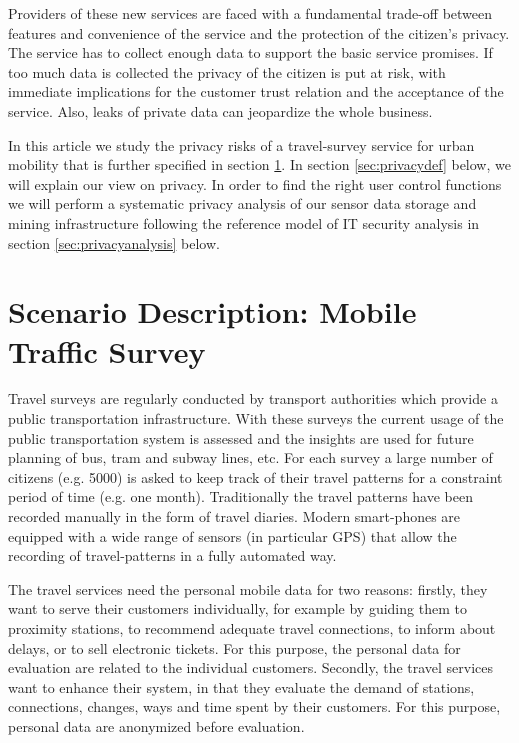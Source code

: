 \documentclass[runningheads,a4paper]{llncs}
\begin{document}
Providers of these new services are faced with a fundamental trade-off
between features and convenience of the service and the protection of
the citizen's privacy. The service has to collect enough data to
support the basic service promises. If too much data is collected the
privacy of the citizen is put at risk, with immediate implications for
the customer trust relation and the acceptance of the service. Also,
leaks of private data can jeopardize the whole business.

In this article we study the privacy risks of a travel-survey service
for urban mobility that is further specified in section \ref{sec:ScenarioDescription}. In section \ref{sec:privacydef} below, we will explain our view on privacy. In order to find the right user control functions we will perform a systematic privacy analysis of our sensor data storage and mining infrastructure following the reference model of IT security analysis \cite{Grimm:ItSecRefModel} in section \ref{sec:privacyanalysis} below.


\section{Scenario Description: Mobile Traffic Survey}
\label{sec:ScenarioDescription}

Travel surveys are regularly conducted by transport authorities which provide
a public transportation infrastructure. With these surveys the current
usage of the public transportation system is assessed and the insights
are used for future planning of bus, tram and subway lines, etc.  For
each survey a large number of citizens (e.g. 5000) is asked to keep
track of their travel patterns for a constraint period of time
(e.g. one month). Traditionally the travel patterns have been recorded
manually in the form of travel diaries. Modern smart-phones are
equipped with a wide range of sensors (in particular GPS) that allow
the recording of travel-patterns in a fully automated way.

The travel services need the personal mobile data for two reasons: firstly, they want to serve their customers individually, for example by guiding them to proximity stations, to recommend adequate travel connections, to inform about delays, or to sell electronic tickets. For this purpose, the personal data for evaluation are related to the individual customers. Secondly, the travel services want to enhance their system, in that they evaluate the demand of stations, connections, changes, ways and time spent by their customers. For this purpose, personal data are anonymized before evaluation.
\end{document}
